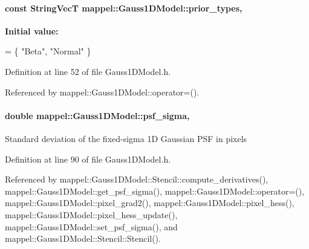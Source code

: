 \paragraph[{\texorpdfstring{prior\+\_\+types}{prior_types}}]{\setlength{\rightskip}{0pt plus 5cm}const {\bf String\+VecT} mappel\+::\+Gauss1\+D\+Model\+::prior\+\_\+types\hspace{0.3cm}{\ttfamily [static]}, {\ttfamily [inherited]}}\hypertarget{classmappel_1_1Gauss1DModel_a2f72a3c4729aa81d8ffdd96a60374cd6}{}\label{classmappel_1_1Gauss1DModel_a2f72a3c4729aa81d8ffdd96a60374cd6}
{\bfseries Initial value\+:}
\begin{DoxyCode}
= \{ \textcolor{stringliteral}{"Beta"}, 
                                                       \textcolor{stringliteral}{"Normal"}  
                                                      \}
\end{DoxyCode}


Definition at line 52 of file Gauss1\+D\+Model.\+h.



Referenced by mappel\+::\+Gauss1\+D\+Model\+::operator=().

\paragraph[{\texorpdfstring{psf\+\_\+sigma}{psf_sigma}}]{\setlength{\rightskip}{0pt plus 5cm}double mappel\+::\+Gauss1\+D\+Model\+::psf\+\_\+sigma\hspace{0.3cm}{\ttfamily [protected]}, {\ttfamily [inherited]}}\hypertarget{classmappel_1_1Gauss1DModel_a62c6b2a5d8ab5f5596504a19daed66b2}{}\label{classmappel_1_1Gauss1DModel_a62c6b2a5d8ab5f5596504a19daed66b2}
Standard deviation of the fixed-\/sigma 1D Gaussian P\+SF in pixels 

Definition at line 90 of file Gauss1\+D\+Model.\+h.



Referenced by mappel\+::\+Gauss1\+D\+Model\+::\+Stencil\+::compute\+\_\+derivatives(), mappel\+::\+Gauss1\+D\+Model\+::get\+\_\+psf\+\_\+sigma(), mappel\+::\+Gauss1\+D\+Model\+::operator=(), mappel\+::\+Gauss1\+D\+Model\+::pixel\+\_\+grad2(), mappel\+::\+Gauss1\+D\+Model\+::pixel\+\_\+hess(), mappel\+::\+Gauss1\+D\+Model\+::pixel\+\_\+hess\+\_\+update(), mappel\+::\+Gauss1\+D\+Model\+::set\+\_\+psf\+\_\+sigma(), and mappel\+::\+Gauss1\+D\+Model\+::\+Stencil\+::\+Stencil().

